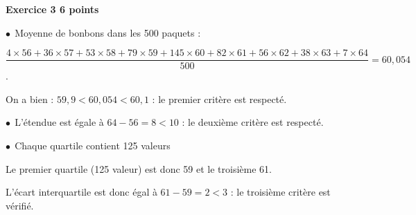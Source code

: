 \textbf{Exercice 3 \hfill 6 points}

\medskip

%
%
%
%
%
%
%
% 
% 
$\bullet~~$Moyenne de bonbons dans les 500 paquets :

$\dfrac{4\times 56 + 36\times57 + 53\times58+79\times59 + 145\times60 + 82 \times61 + 56\times62 + 38\times63 + 7\times64}{500} = 60,054$.

On a bien : $59,9 < 60,054 < 60,1$ : le premier critère est respecté.

$\bullet~~$L'étendue est égale à $64 - 56 = 8 < 10$ : le deuxième critère est respecté.

$\bullet~~$Chaque quartile contient 125 valeurs

Le premier quartile (125 valeur) est donc 59 et le troisième 61.

L'écart interquartile est donc égal à $61 - 59 = 2 < 3$ : le troisième critère est vérifié.

\bigskip

